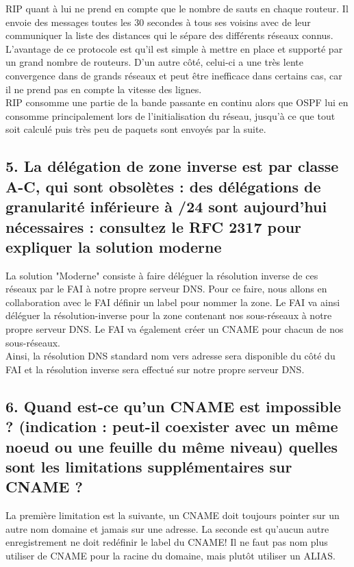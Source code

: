 \documentclass{article}
\begin{document}
RIP quant à lui ne prend en compte que le nombre de sauts en chaque routeur. Il envoie des messages toutes les 30 secondes à tous ses voisins avec de leur communiquer la liste des distances qui le sépare des différents réseaux connus. L'avantage de ce protocole est qu'il est simple à mettre en place et supporté par un grand nombre de routeurs. D'un autre côté, celui-ci a une très lente convergence dans de grands réseaux et peut être inefficace dans certains cas, car il ne prend pas en compte la vitesse des lignes.\cite{RIP-VS-OSPF}\\

RIP consomme une partie de la bande passante en continu alors que OSPF lui en consomme principalement lors de l'initialisation du réseau, jusqu'à ce que tout soit calculé puis très peu de paquets sont envoyés par la suite.\\

\subsection*{5. La délégation de zone inverse est par classe A-C, qui sont obsolètes : des délégations de granularité inférieure à /24 sont aujourd’hui nécessaires : consultez le RFC 2317 pour expliquer la solution moderne}
La solution "Moderne" consiste à faire déléguer la résolution inverse de ces réseaux par le FAI à notre propre serveur DNS. Pour ce faire, nous allons en collaboration avec le FAI définir un label pour nommer la zone. Le FAI va ainsi déléguer la résolution-inverse pour la zone contenant nos sous-réseaux à notre propre serveur DNS. Le FAI va également créer un CNAME pour chacun de nos sous-réseaux.\\

Ainsi, la résolution DNS standard nom vers adresse sera disponible du côté du FAI et la résolution inverse sera effectué sur notre propre serveur DNS\cite{RFC-2317-ietf}\cite{RFC-2317-divers}.

\subsection*{6. Quand est-ce qu’un CNAME est impossible ? (indication : peut-il coexister avec un même noeud ou une feuille du même niveau) quelles sont les limitations supplémentaires sur CNAME ?}
La première limitation est la suivante, un CNAME\cite{CNAME} doit toujours pointer sur un autre nom domaine et jamais sur une adresse. La seconde est qu'aucun autre enregistrement ne doit redéfinir le label du CNAME! Il ne faut pas nom plus utiliser de CNAME pour la racine du domaine, mais plutôt utiliser un ALIAS\cite{ALIAS}.\\
\end{document}
